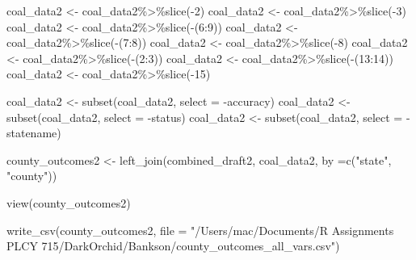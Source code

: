 \documentclass[
]{article}
\newenvironment{Shaded}{\begin{snugshade}}{\end{snugshade}}
\newcommand{\AttributeTok}[1]{\textcolor[rgb]{0.77,0.63,0.00}{#1}}
\newcommand{\DecValTok}[1]{\textcolor[rgb]{0.00,0.00,0.81}{#1}}
\newcommand{\FunctionTok}[1]{\textcolor[rgb]{0.00,0.00,0.00}{#1}}
\newcommand{\NormalTok}[1]{#1}
\newcommand{\OtherTok}[1]{\textcolor[rgb]{0.56,0.35,0.01}{#1}}
\newcommand{\SpecialCharTok}[1]{\textcolor[rgb]{0.00,0.00,0.00}{#1}}
\newcommand{\StringTok}[1]{\textcolor[rgb]{0.31,0.60,0.02}{#1}}
\begin{document}
\begin{Shaded}
\begin{Highlighting}[]
\NormalTok{coal\_data2 }\OtherTok{\textless{}{-}}\NormalTok{ coal\_data2}\SpecialCharTok{\%\textgreater{}\%}\FunctionTok{slice}\NormalTok{(}\SpecialCharTok{{-}}\DecValTok{2}\NormalTok{)}
\NormalTok{coal\_data2 }\OtherTok{\textless{}{-}}\NormalTok{ coal\_data2}\SpecialCharTok{\%\textgreater{}\%}\FunctionTok{slice}\NormalTok{(}\SpecialCharTok{{-}}\DecValTok{3}\NormalTok{)}
\NormalTok{coal\_data2 }\OtherTok{\textless{}{-}}\NormalTok{ coal\_data2}\SpecialCharTok{\%\textgreater{}\%}\FunctionTok{slice}\NormalTok{(}\SpecialCharTok{{-}}\NormalTok{(}\DecValTok{6}\SpecialCharTok{:}\DecValTok{9}\NormalTok{))}
\NormalTok{coal\_data2 }\OtherTok{\textless{}{-}}\NormalTok{ coal\_data2}\SpecialCharTok{\%\textgreater{}\%}\FunctionTok{slice}\NormalTok{(}\SpecialCharTok{{-}}\NormalTok{(}\DecValTok{7}\SpecialCharTok{:}\DecValTok{8}\NormalTok{))}
\NormalTok{coal\_data2 }\OtherTok{\textless{}{-}}\NormalTok{ coal\_data2}\SpecialCharTok{\%\textgreater{}\%}\FunctionTok{slice}\NormalTok{(}\SpecialCharTok{{-}}\DecValTok{8}\NormalTok{)}
\NormalTok{coal\_data2 }\OtherTok{\textless{}{-}}\NormalTok{ coal\_data2}\SpecialCharTok{\%\textgreater{}\%}\FunctionTok{slice}\NormalTok{(}\SpecialCharTok{{-}}\NormalTok{(}\DecValTok{2}\SpecialCharTok{:}\DecValTok{3}\NormalTok{))}
\NormalTok{coal\_data2 }\OtherTok{\textless{}{-}}\NormalTok{ coal\_data2}\SpecialCharTok{\%\textgreater{}\%}\FunctionTok{slice}\NormalTok{(}\SpecialCharTok{{-}}\NormalTok{(}\DecValTok{13}\SpecialCharTok{:}\DecValTok{14}\NormalTok{))}
\NormalTok{coal\_data2 }\OtherTok{\textless{}{-}}\NormalTok{ coal\_data2}\SpecialCharTok{\%\textgreater{}\%}\FunctionTok{slice}\NormalTok{(}\SpecialCharTok{{-}}\DecValTok{15}\NormalTok{)}

\NormalTok{coal\_data2 }\OtherTok{\textless{}{-}} \FunctionTok{subset}\NormalTok{(coal\_data2, }\AttributeTok{select =} \SpecialCharTok{{-}}\NormalTok{accuracy)}
\NormalTok{coal\_data2 }\OtherTok{\textless{}{-}} \FunctionTok{subset}\NormalTok{(coal\_data2, }\AttributeTok{select =} \SpecialCharTok{{-}}\NormalTok{status)}
\NormalTok{coal\_data2 }\OtherTok{\textless{}{-}} \FunctionTok{subset}\NormalTok{(coal\_data2, }\AttributeTok{select =} \SpecialCharTok{{-}}\NormalTok{statename)}

\NormalTok{county\_outcomes2 }\OtherTok{\textless{}{-}} \FunctionTok{left\_join}\NormalTok{(combined\_draft2, coal\_data2, }\AttributeTok{by =}\FunctionTok{c}\NormalTok{(}\StringTok{"state"}\NormalTok{, }\StringTok{"county"}\NormalTok{))}

\FunctionTok{view}\NormalTok{(county\_outcomes2)}

\FunctionTok{write\_csv}\NormalTok{(county\_outcomes2, }\AttributeTok{file =} \StringTok{"/Users/mac/Documents/R Assignments PLCY 715/DarkOrchid/Bankson/county\_outcomes\_all\_vars.csv"}\NormalTok{)}
\end{Highlighting}
\end{Shaded}
\end{document}
